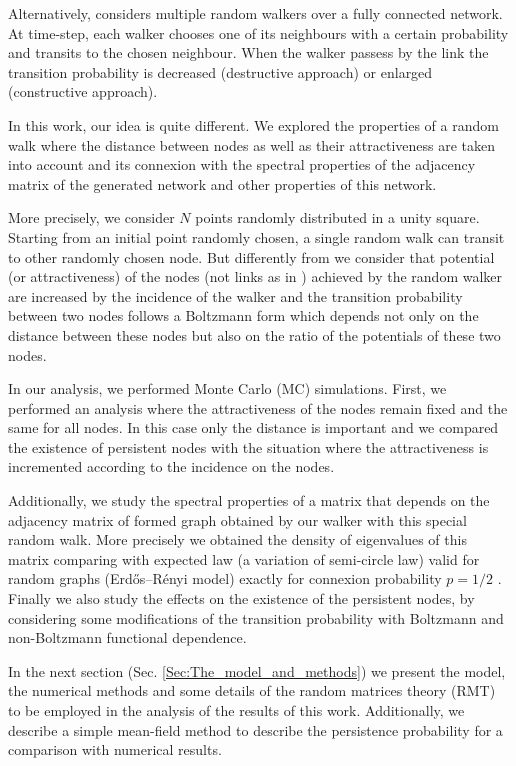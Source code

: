 \documentclass[3p, 11pt]{elsarticle}
\begin{document}
Alternatively, \cite{Mehraban2012} considers multiple random walkers over a
fully connected network. At time-step, each walker chooses one of its
neighbours with a certain probability and transits to the chosen neighbour.
When the walker passess by the link the transition probability is decreased
(destructive approach) or enlarged (constructive approach).

In this work, our idea is quite different. We explored the properties of a
random walk where the distance between nodes as well as their attractiveness
are taken into account and its connexion with the spectral properties of the
adjacency matrix of the generated network and other properties of this
network.

More precisely, we consider $N$ points randomly distributed in a unity
square. Starting from an initial point randomly chosen, a single random walk
can transit to other randomly chosen node. But differently from \cite%
{Mehraban2012} we consider that potential (or attractiveness) of the nodes
(not links as in \cite{Mehraban2012}) achieved by the random walker are
increased by the incidence of the walker and the transition probability
between two nodes follows a Boltzmann form which depends not only on the
distance between these nodes but also on the ratio of the potentials of
these two nodes.

In our analysis, we performed Monte Carlo (MC) simulations. First, we
performed an analysis where the attractiveness of the nodes remain fixed and
the same for all nodes. In this case only the distance is important and we
compared the existence of persistent nodes with the situation where the
attractiveness is incremented according to the incidence on the nodes.

Additionally, we study the spectral properties of a matrix that depends on
the adjacency matrix of formed graph obtained by our walker with this
special random walk. More precisely we obtained the density of eigenvalues
of this matrix comparing with expected law (a variation of semi-circle law)
valid for random graphs (Erd\H{o}s--R\'{e}nyi model) exactly for connexion
probability $p=1/2$ . Finally we also study the effects on the existence of
the persistent nodes, by considering some modifications of the transition
probability with Boltzmann and non-Boltzmann functional dependence.

In the next section (Sec. \ref{Sec:The_model_and_methods}) we present the
model, the numerical methods and some details of the random matrices theory
(RMT) to be employed in the analysis of the results of this work.
Additionally, we describe a simple mean-field method to describe the
persistence probability for a comparison with numerical results.
\end{document}
